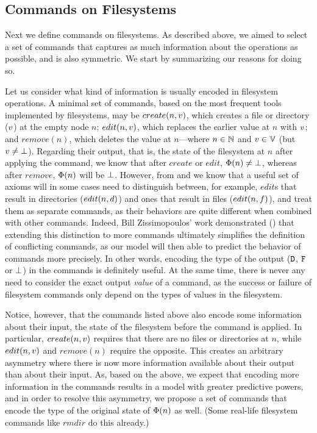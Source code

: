 
\subsection{Commands on Filesystems}


Next we define commands on filesystems.
As described above, we aimed to select a set of commands
that captures as much information
about the operations as possible, and is also symmetric.
We start by summarizing our reasons for doing so.

Let us consider what kind of information is usually encoded in filesystem operations.
A minimal set of commands, based on the most frequent tools implemented by filesystems,
may be $create(n,v)$, which creates a file or directory ($v$) at the empty node $n$;
$edit(n,v)$, which replaces the earlier value at $n$ with $v$;
and $remove(n)$, which deletes the value at $n$---where 
$n\in\mathbb{N}$ and $v\in\mathbb{V}$ (but $v\neq\bot$).
Regarding their output, that is, the state of the filesystem at $n$
after applying the command,
we know that after $create$ or $edit$, $\Phi(n)\neq\bot$, whereas after $remove$,
$\Phi(n)$ will be $\bot$. 
However, from \cite{NREC} and \cite{CBNR} we know that a useful set of axioms
will in some cases need to distinguish between, for example,
$edit$s that result in directories ($edit(n,d)$) and
ones that result in files ($edit(n,f)$), and treat them as separate commands,
as their behaviors are quite different when combined with other commands.
Indeed, Bill Zissimopoulos' work
demonstrated (\cite{BZ})
that extending this distinction to more commands ultimately simplifies
the definition of conflicting commands, as our model will then able to predict the behavior of commands
more precisely.
In other words, encoding the type of the output ($\mathtt{D}$, $\mathtt{F}$ or $\bot$) in the commands is definitely useful.
At the same time, there is never any need to consider the
exact output \emph{value} of a command,
as the success or failure of filesystem commands only depend on the types of values in the filesystem.

Notice, however, that the commands listed above also encode some information about 
their input, the state of the filesystem
before the command is applied. In particular, $create(n,v)$ requires that there are no files
or directories at $n$, while $edit(n,v)$ and $remove(n)$ require the opposite.
This creates an arbitrary asymmetry where
there is now more information available about their output than about their input.
As, based on the above, we expect that encoding more information in the commands
results in a model with greater predictive powers,
and in order to resolve this asymmetry, 
we propose a set of commands that encode
the type of the original state of $\Phi(n)$ as well.
(Some real-life filesystem commands like $rmdir$ do this already.)

